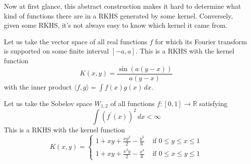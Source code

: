   Now at first glance, this abstract construction makes it hard to determine what kind of functions there are in a RKHS generated by some kernel. Conversely, given some RKHS, it's not always easy to know which kernel it came from. 

  \begin{example}
    Let us take the vector space of all real functions $f$ for which its Fourier transform is supported on some finite interval $[-a, a]$. This is a RKHS with the kernel function 
    \begin{equation}
      K(x, y) = \frac{\sin(a(y - x))}{a(y - x)}
    \end{equation}
    with the inner product $\langle f, g \rangle = \int f(x) g(x) \,dx$.
  \end{example}

  \begin{example}
    Let us take the Sobelov space $W_{1, 2}$ of all functions $f: [0, 1] \rightarrow \mathbb{R}$ satisfying 
    \begin{equation}
      \int (f^\prime (x))^2 \,dx < \infty
    \end{equation} 
    This is a RKHS with the kernel function 
    \begin{equation}
      K(x, y) = \begin{cases} 1 + xy + \frac{xy^2}{2} - \frac{y^3}{6} & \text{ if } 0 \leq y \leq x \leq 1 \\
        1 + xy + \frac{x^2 y}{2} - \frac{x^3}{6} & \text{ if } 0 \leq x \leq y \leq 1 \end{cases}
    \end{equation}
  \end{example}

